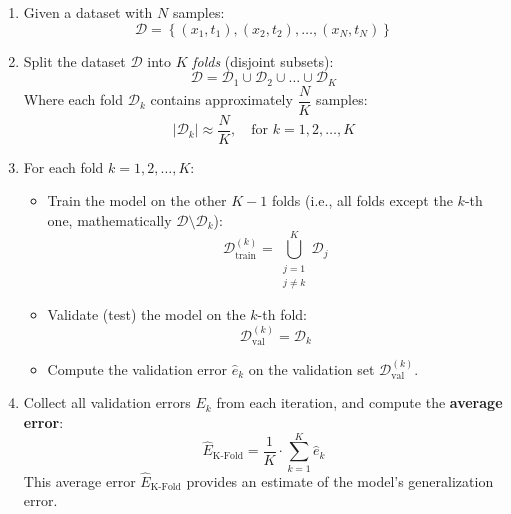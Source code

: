 \begin{enumerate}
    \item Given a dataset with $N$ samples:
    \begin{equation*}
        \mathcal{D} = \left\{
            \left(x_1, t_1\right),
            \left(x_2, t_2\right),
            \ldots,
            \left(x_N, t_N\right)
        \right\}
    \end{equation*}
    \item Split the dataset $\mathcal{D}$ into $K$ \emph{folds} (disjoint subsets):
    \begin{equation*}
        \mathcal{D} = \mathcal{D}_1 \cup \mathcal{D}_2 \cup \ldots \cup \mathcal{D}_K
    \end{equation*}
    Where each fold $\mathcal{D}_k$ contains approximately $\dfrac{N}{K}$ samples:
    \begin{equation*}
        \left| \mathcal{D}_k \right| \approx \dfrac{N}{K}, \quad \text{for } k = 1, 2, \ldots, K
    \end{equation*}
    \item For each fold $k = 1, 2, \ldots, K$:
    \begin{itemize}
        \item Train the model on the other $K-1$ folds (i.e., all folds except the $k$-th one, mathematically $\mathcal{D} \setminus \mathcal{D}_k$):
        \begin{equation*}
            \mathcal{D}_{\text{train}}^{(k)} = \bigcup_{\substack{j=1 \\ j \neq k}}^{K} \mathcal{D}_j
        \end{equation*}
        \item Validate (test) the model on the $k$-th fold:
        \begin{equation*}
            \mathcal{D}_{\text{val}}^{(k)} = \mathcal{D}_k
        \end{equation*}
        \item Compute the validation error $\hat{e}_{k}$ on the validation set $\mathcal{D}_{\text{val}}^{(k)}$.
    \end{itemize}
    \item Collect all validation errors $E_{k}$ from each iteration, and compute the \textbf{average error}:
    \begin{equation*}
        \hat{E}_{\text{K-Fold}} = \dfrac{1}{K} \cdot \sum_{k=1}^{K} \hat{e}_{k}
    \end{equation*}
    This average error $\hat{E}_{\text{K-Fold}}$ provides an estimate of the model's generalization error.
\end{enumerate}
